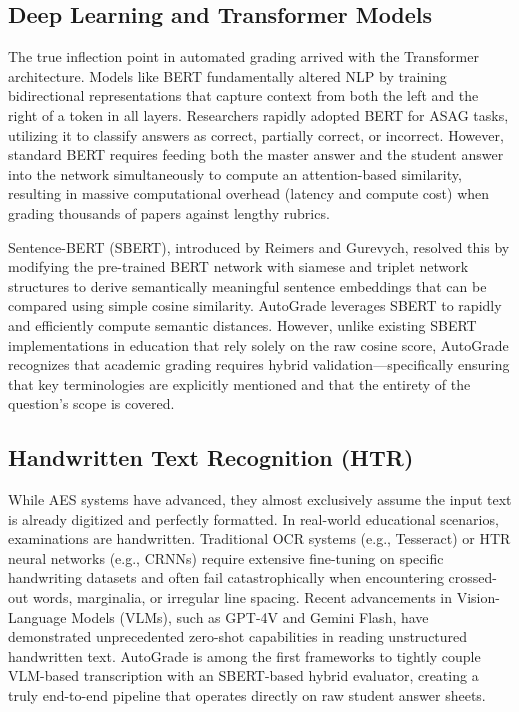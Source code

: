 \documentclass[conference]{IEEEtran}
\begin{document}
\subsection{Deep Learning and Transformer Models}
The true inflection point in automated grading arrived with the Transformer architecture. Models like BERT fundamentally altered NLP by training bidirectional representations that capture context from both the left and the right of a token in all layers. Researchers rapidly adopted BERT for ASAG tasks, utilizing it to classify answers as correct, partially correct, or incorrect. However, standard BERT requires feeding both the master answer and the student answer into the network simultaneously to compute an attention-based similarity, resulting in massive computational overhead (latency and compute cost) when grading thousands of papers against lengthy rubrics.

Sentence-BERT (SBERT), introduced by Reimers and Gurevych, resolved this by modifying the pre-trained BERT network with siamese and triplet network structures to derive semantically meaningful sentence embeddings that can be compared using simple cosine similarity. AutoGrade leverages SBERT to rapidly and efficiently compute semantic distances. However, unlike existing SBERT implementations in education that rely solely on the raw cosine score, AutoGrade recognizes that academic grading requires hybrid validation—specifically ensuring that key terminologies are explicitly mentioned and that the entirety of the question's scope is covered.

\subsection{Handwritten Text Recognition (HTR)}
While AES systems have advanced, they almost exclusively assume the input text is already digitized and perfectly formatted. In real-world educational scenarios, examinations are handwritten. Traditional OCR systems (e.g., Tesseract) or HTR neural networks (e.g., CRNNs) require extensive fine-tuning on specific handwriting datasets and often fail catastrophically when encountering crossed-out words, marginalia, or irregular line spacing. Recent advancements in Vision-Language Models (VLMs), such as GPT-4V and Gemini Flash, have demonstrated unprecedented zero-shot capabilities in reading unstructured handwritten text. AutoGrade is among the first frameworks to tightly couple VLM-based transcription with an SBERT-based hybrid evaluator, creating a truly end-to-end pipeline that operates directly on raw student answer sheets.
\end{document}
